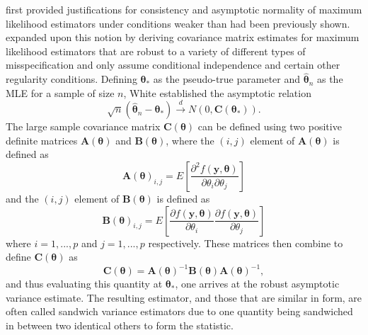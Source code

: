 \documentclass[sn-mathphys-ay]{sn-jnl}
\begin{document}
		\citet{Huber} first provided justifications for consistency and asymptotic normality of maximum likelihood estimators under conditions weaker than had been previously shown. \citet{White1982}
		expanded upon this notion by deriving covariance matrix estimates for maximum likelihood estimators that are robust to a variety of different types of misspecification and only assume
		conditional independence and certain other regularity conditions. Defining $\bm{\theta}_*$ as the pseudo-true parameter and $\hat{\bm{\theta}}_n$ as the MLE for a sample of size
		$n$, White established the asymptotic relation
		\begin{equation*}
			\sqrt{n} (\hat{\bm{\theta}}_n - \bm{\theta}_*) \xrightarrow[]{d} N(0, \bm{C}(\bm{\theta}_* ) ) .
		\end{equation*}
		The large sample covariance matrix $\bm{C}(\bm{\theta})$ can be defined using two positive definite matrices $\bm{A}(\bm{\theta})$ and $\bm{B}(\bm{\theta})$, where the $(i,j)$ element of $\bm{A}(\bm{\theta})$ is defined as
		\begin{equation*}
			\bm{A}(\bm{\theta})_{i,j} = E \left[ \frac{\partial^2 f(\bm{y},\bm{\theta})}{\partial \theta_i \partial \theta_j} \right] 
		\end{equation*}
		and the $(i,j)$ element of $\bm{B}(\bm{\theta})$ is defined as
		\begin{equation*}
			\bm{B}(\bm{\theta})_{i,j} = E \left[ \frac{\partial f(\bm{y},\bm{\theta})}{\partial \theta_i} \frac{\partial f(\bm{y},\bm{\theta})}{\partial \theta_j} \right] 
		\end{equation*}
		where $i = 1,...,p$ and $j = 1,...,p$ respectively. These matrices then combine to define $\bm{C}(\bm{\theta})$ as
		\begin{equation*}
			\bm{C}(\bm{\theta}) = \bm{A}(\bm{\theta})^{-1} \bm{B}(\bm{\theta}) \bm{A}(\bm{\theta})^{-1} ,
		\end{equation*}
		and thus evaluating this quantity at $\bm{\theta}_*$, one arrives at the robust asymptotic variance estimate. The resulting estimator, and those that are similar in form, are often called sandwich
		variance estimators due to one quantity being sandwiched in between two identical others to form the statistic.
\end{document}
